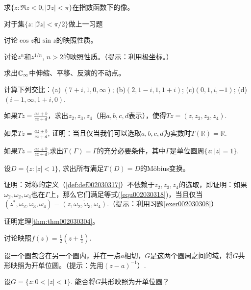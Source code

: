 \begin{problemset}
\item 求$\{z:\Re{z} < 0, |\Im{z}| < \pi\}$在指数函数下的像。

\item 对于集$\{z:|\Im{z}|< \pi/2\}$做上一习题

\item 讨论$\cos{z}$和$\sin{z}$的映照性质。

\item 讨论$z^n$和$z^{1/n}$, $n>2$的映照性质。（提示：利用极坐标。）

\item 求出$\mathbb{C}_{\infty}$中伸缩、平移、反演的不动点。

\item 计算下列交比：(a) $(7+i,1,0,\infty)$; (b)$(2, 1-i, 1, 1+i)$; (c)$(0, 1, i, -1)$; (d)$(i-1, \infty, 1+i, 0)$.

\item 如果$Tz = \frac{az+b}{cz+d}$，求出$z_2,z_3, z_4$（用$a,b,c,d$表示），使得$Tz = (z, z_2, z_3, z_4)$.

\item\label{exer002030308}如果$Tz = \frac{az+b}{cz+d}$, 证明：当且仅当我们可以选取$a,b,c,d$为实数时$T(\mathbb{R}) = \mathbb{R}$.

\item 如果$Tz = \frac{az+b}{cz+d}$,求出$T(\Gamma) = \Gamma$的充分必要条件，其中$\Gamma$是单位圆周$\{z:|z|=1\}$.

\item 设$D = \{z:|z|<1\}$, 求出所有满足$T(D)=D$的M\"obius变换。

\item\label{exer002030311}证明：对称的定义（\ref{def:def002030317}）不依赖于$z_2,z_3,z_4$的选取，即证明：如果$\omega_2, \omega_2, \omega_4$也在$\Gamma$上，那么它们满足等式(\ref{equ002030318})，当且仅当$(z^*, \omega_2, \omega_3, \omega_4) = \overline{(z, \omega_2, \omega_3, \omega_4)}$.（提示：利用习题\ref{exer002030308}）

\item 证明定理\ref{thm:thm002030304}。

\item 讨论映照$f(z) = \frac{1}{2}(z + \frac{1}{z})$.

\item 设一个圆包含在另一个圆内，并在一点$a$相切，$G$是这两个圆周之间的域，将$G$共形映照为开单位圆。（提示：先用$(z-a)^{-1}$）.

\item 设$G = \{z: 0 < |z| < 1\}$. 能否将$G$共形映照为开单位圆？


\end{problemset}
